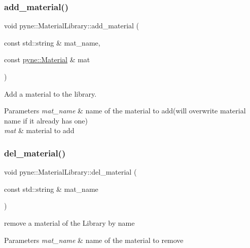 \subsubsection{\texorpdfstring{add\+\_\+material()}{add\_material()}\hspace{0.1cm}{\footnotesize\ttfamily [2/2]}}
{\footnotesize\ttfamily void pyne\+::\+Material\+Library\+::add\+\_\+material (\begin{DoxyParamCaption}\item[{const std\+::string \&}]{mat\+\_\+name,  }\item[{const \hyperlink{classpyne_1_1_material}{pyne\+::\+Material} \&}]{mat }\end{DoxyParamCaption})}



Add a material to the library. 


\begin{DoxyParams}{Parameters}
{\em mat\+\_\+name} & name of the material to add(will overwrite material name if it already has one) \\
\hline
{\em mat} & material to add \\
\hline
\end{DoxyParams}
\mbox{\label{classpyne_1_1_material_library_a2b433e4d9c8d5c7cfeed915cd83f843c}} 
\subsubsection{\texorpdfstring{del\+\_\+material()}{del\_material()}}
{\footnotesize\ttfamily void pyne\+::\+Material\+Library\+::del\+\_\+material (\begin{DoxyParamCaption}\item[{const std\+::string \&}]{mat\+\_\+name }\end{DoxyParamCaption})}



remove a material of the Library by name 


\begin{DoxyParams}{Parameters}
{\em mat\+\_\+name} & name of the material to remove \\
\hline
\end{DoxyParams}
\mbox{\label{classpyne_1_1_material_library_a6e416ec04f0ba8e61889741ff20deac8}} 
